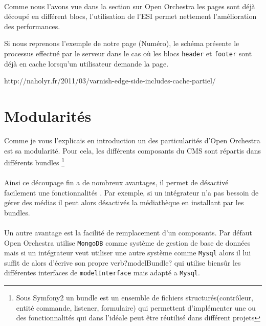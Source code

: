    \paragraph{}
   Comme nous l'avons vue dans la section sur Open Orchestra les pages sont déjà découpé en différent blocs, l'utilisation de l'ESI permet nettement l'amélioration des performances.

   Si nous reprenons l'exemple de notre page (Numéro), le schéma présente le processus effectué par le serveur dans le cas où les blocs \verb?header? et \verb?footer? sont déjà en cache lorsqu'un utilisateur demande la page.

   http://naholyr.fr/2011/03/varnish-edge-side-includes-cache-partiel/
   \section{Modularités}
   Comme je vous l'explicais en introduction un des particularités d'Open Orchestra est sa modularité. Pour cela, les différents composants du CMS sont répartis dans différents bundles \footnote{Sous Symfony2 un bundle est un ensemble de fichiers structurés(contrôleur, entité commande, listener, formulaire) qui permettent d'implémenter une ou des fonctionnalités qui dans l'idéale peut être réutilisé dans différent projets}
   \paragraph{}
   \begin{itemize}
   \end{itemize}
   \paragraph{}
   Ainsi ce découpage fin a de nombreux avantages, il permet de désactivé facilement une fonctionnalités . Par exemple, si un intégrateur n'a pas bessoin de gérer des médias il peut alors désactivés la médiathèque en installant par les bundles.

   \paragraph{}
   Un autre avantage est la facilité de remplacement d'un composants. Par défaut Open Orchestra utilise \verb?MongoDB? comme système de gestion de base de données mais si un intégrateur veut utiliser une autre système comme \verb?Mysql? alors il lui suffit de alors d'écrive son propre verb?modelBundle? qui utilise biensûr les différentes interfaces de \verb?modelInterface? mais adapté a \verb?Mysql?.